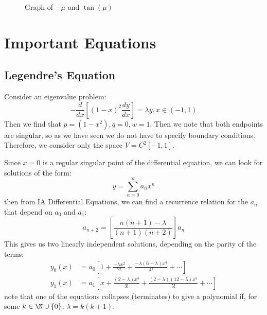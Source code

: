 \documentclass[../Main.tex]{subfiles}
\begin{document}
\begin{figure}
    \centering
    \caption{Graph of $-\mu$ and $\tan(\mu)$}
    \label{figEValGraph}
\end{figure}
\section{Important Equations}
\subsection{Legendre's Equation}
Consider an eigenvalue problem:
\begin{equation}
    -\frac{d}{dx}\left[(1 - x)^2 \frac{dy}{dx}\right] = \lambda y, x \in (-1, 1)
    \label{eqnLegendre}
\end{equation}
Then we find that $p = (1 - x^2), q = 0, w = 1$. Then we note that both endpoints are singular, so as we have seen we do not have to specify boundary conditions. Therefore, we consider only the space $V = C^2[-1, 1]$.

Since $x = 0$ is a regular singular point of the differential equation, we can look for solutions of the form:
\begin{equation*}
    y = \sum_{n=0}^{\infty} a_n x^n
\end{equation*}
then from IA Differential Equations, we can find a recurrence relation for the $a_n$ that depend on $a_0$ and $a_1$:
\begin{equation*}
    a_{n+2} = \left[\frac{n(n+1)-\lambda}{(n+1)(n+2)}\right]a_n
\end{equation*}
This gives us two linearly independent solutions, depending on the parity of the terms:
\begin{align*}
    y_0(x) &= a_0 \left[1 + \frac{-\lambda x^2}{2!} + \frac{-\lambda (6-\lambda)x^4}{4!} + \cdots\right] \\
    y_1(x) &= a_1 \left[x + \frac{(2-\lambda)x^3}{3!} + \frac{(2-\lambda)(12-\lambda)x^5}{5!} + \cdots\right]
\end{align*}
note that one of the equations collapses (terminates) to give a polynomial if, for some $k \in \N \cup \{0\}$, $\lambda = k(k+1)$.
\end{document}
